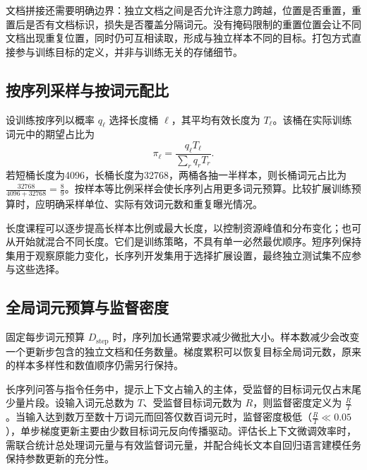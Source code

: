 \documentclass[../textbook.tex]{subfiles}
\begin{document}
文档拼接还需要明确边界：独立文档之间是否允许注意力跨越，位置是否重置，重置后是否有文档标识，损失是否覆盖分隔词元。没有掩码限制的重置位置会让不同文档出现重复位置，同时仍可互相读取，形成与独立样本不同的目标。打包方式直接参与训练目标的定义，并非与训练无关的存储细节。

\subsection{按序列采样与按词元配比}
设训练按序列以概率 $q_\ell$ 选择长度桶 $\ell$，其平均有效长度为 $T_\ell$。该桶在实际训练词元中的期望占比为
\begin{equation}\label{eq:lc-lengthmix}
 \pi_\ell=\frac{q_\ell T_\ell}{\sum_r q_rT_r}.
\end{equation}
若短桶长度为4096，长桶长度为32768，两桶各抽一半样本，则长桶词元占比为 $\frac{32768}{4096+32768}=\frac{8}{9}$。按样本等比例采样会使长序列占用更多词元预算。比较扩展训练预算时，应明确采样单位、实际有效词元数和重复曝光情况。

长度课程可以逐步提高长样本比例或最大长度，以控制资源峰值和分布变化；也可从开始就混合不同长度。它们是训练策略，不具有单一必然最优顺序。短序列保持集用于观察原能力变化，长序列开发集用于选择扩展设置，最终独立测试集不应参与这些选择。

\subsection{全局词元预算与监督密度}
固定每步词元预算 $D_{\mathrm{step}}$ 时，序列加长通常要求减少微批大小。样本数减少会改变一个更新步包含的独立文档和任务数量。梯度累积可以恢复目标全局词元数，原来的样本多样性和数值顺序仍需另行保持。

长序列问答与指令任务中，提示上下文占输入的主体，受监督的目标词元仅占末尾少量片段。设输入词元总数为 $T$、受监督目标词元数为 $R$，则监督密度定义为 $\frac{R}{T}$。当输入达到数万至数十万词元而回答仅数百词元时，监督密度极低（$\frac{R}{T} \ll 0.05$），单步梯度更新主要由少数目标词元反向传播驱动。评估长上下文微调效率时，需联合统计总处理词元量与有效监督词元量，并配合纯长文本自回归语言建模任务保持参数更新的充分性。
\end{document}
